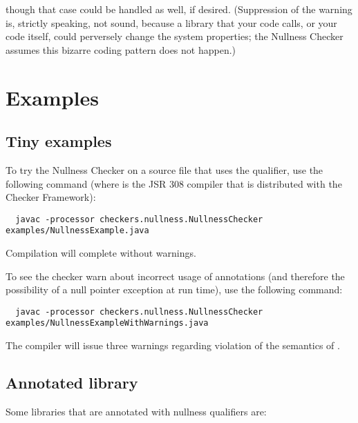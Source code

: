 \noindent
though that case could be handled as well, if desired.
(Suppression of the warning is, strictly speaking, not sound, because a
library that your code calls, or your code itself, could perversely change
the system properties; the Nullness Checker assumes this bizarre coding
pattern does not happen.)


\section{Examples\label{nullness-example}}

\subsection{Tiny examples\label{nullness-tiny-examples}}

To try the Nullness Checker on a source file that uses the  qualifier,
use the following command (where  is the JSR 308 compiler that
is distributed with the Checker Framework):

\begin{Verbatim}
  javac -processor checkers.nullness.NullnessChecker examples/NullnessExample.java
\end{Verbatim}

\noindent
Compilation will complete without warnings.

To see the checker warn about incorrect usage of annotations (and therefore the
possibility of a null pointer exception at run time), use the following command:

\begin{Verbatim}
  javac -processor checkers.nullness.NullnessChecker examples/NullnessExampleWithWarnings.java
\end{Verbatim}

\noindent
The compiler will issue three warnings regarding violation of the semantics of
.


\subsection{Annotated library\label{nullness-annotated-library}}

Some libraries that are annotated with nullness qualifiers are:

